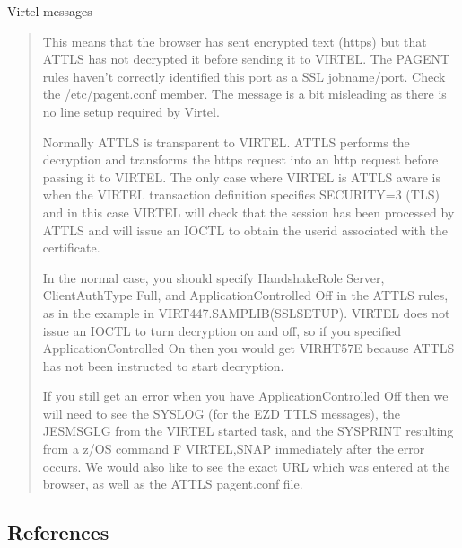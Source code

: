 \documentclass[letterpaper,10pt,english]{sphinxmanual}
\begin{document}
   Virtel messages
\begin{quote}

\sphinxAtStartPar
{}

\sphinxAtStartPar
This means that the browser has sent encrypted text (https) but that AT\sphinxhyphen{}TLS has not decrypted it before sending it to VIRTEL. The PAGENT rules haven’t correctly identified this port as a SSL jobname/port. Check the /etc/pagent.conf member. The message is a bit misleading as there is no line setup required by Virtel.

\sphinxAtStartPar
Normally AT\sphinxhyphen{}TLS is transparent to VIRTEL. AT\sphinxhyphen{}TLS performs the decryption and transforms the https request into an http request before passing it to VIRTEL. The only case where VIRTEL is AT\sphinxhyphen{}TLS aware is when the VIRTEL transaction definition specifies SECURITY=3 (TLS) and in this case VIRTEL will check that the session has been processed by AT\sphinxhyphen{}TLS and will issue an IOCTL to obtain the userid associated with the certificate.

\sphinxAtStartPar
In the normal case, you should specify HandshakeRole Server, ClientAuthType Full, and ApplicationControlled Off in the AT\sphinxhyphen{}TLS rules, as in the example in VIRT447.SAMPLIB(SSLSETUP). VIRTEL does not issue an IOCTL to turn decryption on and off, so if you specified ApplicationControlled On then you would get VIRHT57E because AT\sphinxhyphen{}TLS has not been instructed to start decryption.

\sphinxAtStartPar
If you still get an error when you have ApplicationControlled Off then we will need to see the SYSLOG (for the EZD TTLS messages), the JESMSGLG from the VIRTEL started task, and the SYSPRINT resulting from a z/OS command F VIRTEL,SNAP immediately after the error occurs. We would also like to see the exact URL which was entered at the browser, as well as the AT\sphinxhyphen{}TLS pagent.conf file.
\end{quote}


\subsection{References}
\label{\detokenize{Customization:references}}
\end{document}
